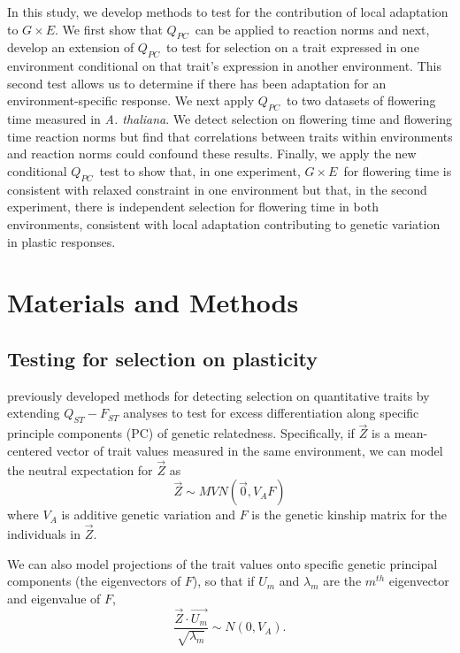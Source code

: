 \documentclass[11pt,letterpaper]{article}
\newcommand{\gxe}{$G \times E$}
\newcommand{\qpc}{$Q_{PC}$}
\begin{document}
In this study, we develop methods to test for the contribution of local adaptation to \gxe.
We first show that \qpc\ can be applied to reaction norms and next, develop an extension of \qpc\ to test for selection on a trait expressed in one environment conditional on that trait's expression in another environment.
This second test allows us to determine if there has been adaptation for an environment-specific response.
We next apply \qpc\ to two datasets of flowering time measured in \textit{A. thaliana}.
We detect selection on flowering time and flowering time reaction norms but find that correlations between traits within environments and reaction norms could confound these results.
Finally, we apply the new conditional \qpc\ test to show that, in one experiment, \gxe\ for flowering time is consistent with relaxed constraint in one environment but that, in the second experiment, there is independent selection for flowering time in both environments, consistent with local adaptation contributing to genetic variation in plastic responses.

\section*{Materials and Methods}

\subsection*{Testing for selection on plasticity}
\cite{Josephs2019} previously developed methods for detecting selection on quantitative traits by extending $Q_{ST}-F_{ST}$ analyses to test for excess differentiation along specific principle components (PC) of genetic relatedness. 
Specifically, if $\vec{Z}$ is a mean-centered vector of trait values measured in the same environment, we can model the neutral expectation for $\vec{Z}$ as 
\begin{equation} \label{eq:mvn}
\vec{Z} \sim MVN (\vec{0}, V_{A}F)
\end{equation}
where $V_{A}$ is additive genetic variation and $F$ is the genetic kinship matrix for the individuals in $\vec{Z}$.

We can also model projections of the trait values onto specific genetic principal components (the eigenvectors of $F$), so that if $U_{m}$ and $\lambda_{m}$ are the $m^{th}$ eigenvector and eigenvalue of $F$,
\begin{equation}
\frac{\vec{Z}\cdot \vec{U_{m}}}{\sqrt{\lambda_{m}}} \sim N(0, V_{A}).
\end{equation}
\end{document}
